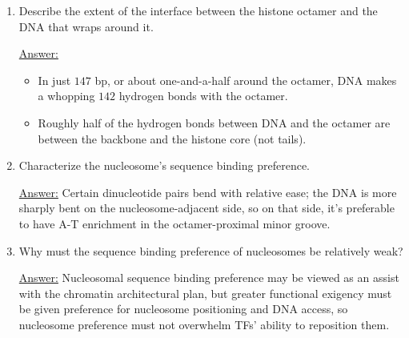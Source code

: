 \documentclass{article}
\newenvironment{QandA}{\begin{enumerate}[label=\bfseries Q\arabic*.]}
                       {\end{enumerate}}
\newenvironment{answered}{\par\normalfont\underline{Answer:}}{}
\begin{document}
\begin{QandA}
    \begin{answered}
    \begin{itemize}
      \item{\textbf{Charge} and \textit{amino acid composition:} DNA is negatively charged, while about $1/5$ of the histone's amino acids are either \textit{lysine} or \textit{arginine.}}
      \item{Basic amino acids are positively charged at neutral pH (because they donate hydroxide ions to solution), so they modest positive charge of the histone core attracts negatively charged DNA.}
    \end{itemize}
    \end{answered}
  \item{Describe the extent of the interface between the histone octamer and the DNA that wraps around it.}
    \begin{answered}
    \begin{itemize}
      \item{In just $147$ bp, or about one-and-a-half  around the octamer, DNA makes a whopping $142$ hydrogen bonds with the octamer.}
      \item{Roughly half of the hydrogen bonds between DNA and the octamer are between the backbone and the histone core (not tails).}
    \end{itemize}
    \end{answered}
  \item{Characterize the nucleosome's sequence binding preference.}
    \begin{answered}
    Certain dinucleotide pairs bend with relative ease; the DNA is more sharply bent on the nucleosome-adjacent side, so on that side, it's preferable to have A-T enrichment in the octamer-proximal minor groove.
    \end{answered}
  \item{Why must the sequence binding preference of nucleosomes be relatively weak?}
    \begin{answered}
    Nucleosomal sequence binding preference may be viewed as an assist with the chromatin architectural plan, but greater functional exigency must be given preference for nucleosome positioning and DNA access, so nucleosome preference must not overwhelm TFs' ability to reposition them.
    \end{answered}
\end{QandA}
\end{document}
